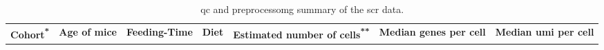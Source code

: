 \begin{table}[ht!]
  \renewcommand{\arraystretch}{1.2} %
  \centering
 \caption[ and preprocessing summary of the  data]{\gls{qc} and preprocessomg summary of the \gls{scr} data.}
     \label{tab:app_scrna_meta}
  \begin{tabularx}{\textwidth}{x C C C C C C}
    \toprule
    \textbf{Cohort\textsuperscript{*}} & \textbf{Age of mice} & \textbf{Feeding-Time} & \textbf{Diet} & \textbf{Estimated number of cells\textsuperscript{**}} & \textbf{Median genes per cell} & \textbf{Median \gls{umi} per cell} \\
    
    

\end{tabularx}
\end{table}
